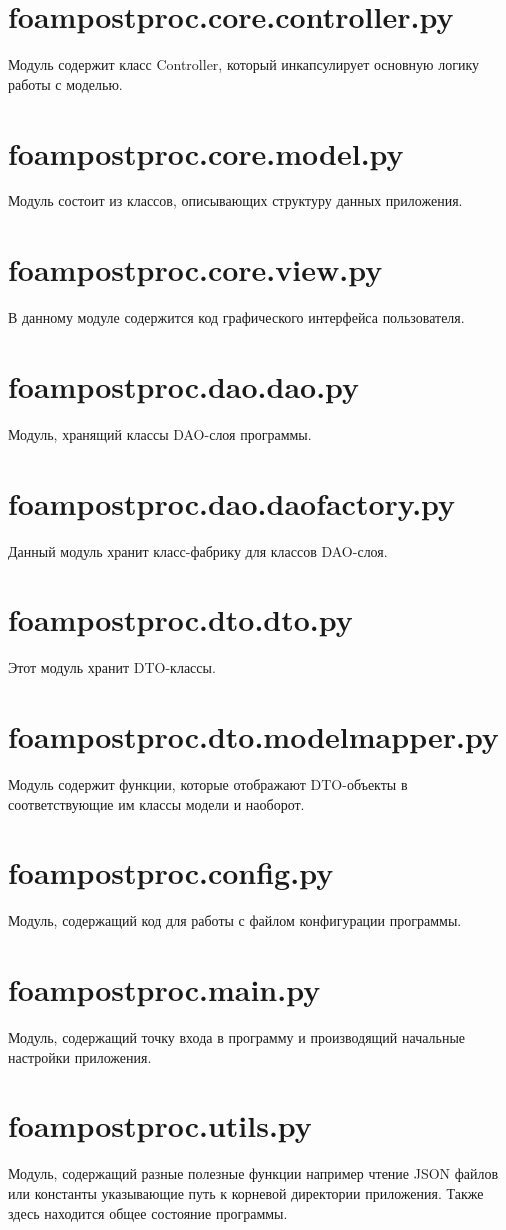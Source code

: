 \documentclass[14pt]{extreport}
\begin{document}
\section{foampostproc.core.controller.py}
Модуль содержит класс Controller, который инкапсулирует основную логику работы с моделью.

\section{foampostproc.core.model.py}
Модуль состоит из классов, описывающих структуру данных приложения.

\section{foampostproc.core.view.py}
В данному модуле содержится код графического интерфейса пользователя.

\section{foampostproc.dao.dao.py}
Модуль, хранящий классы DAO-слоя программы.

\section{foampostproc.dao.daofactory.py}
Данный модуль хранит класс-фабрику для классов DAO-слоя.

\section{foampostproc.dto.dto.py}
Этот модуль хранит DTO-классы.

\section{foampostproc.dto.modelmapper.py}
Модуль содержит функции, которые отображают DTO-объекты в соответствующие им классы модели и наоборот.

\section{foampostproc.config.py}
Модуль, содержащий код для работы с файлом конфигурации программы.

\section{foampostproc.main.py}
Модуль, содержащий точку входа в программу и производящий начальные настройки приложения.

\section{foampostproc.utils.py}
Модуль, содержащий разные полезные функции например чтение JSON файлов или константы указывающие путь к корневой директории приложения. Также здесь находится общее состояние программы.


\end{document}

